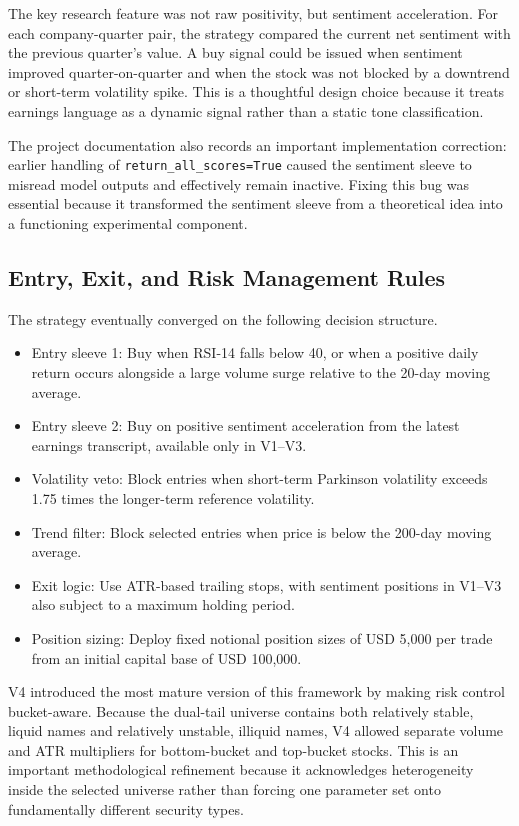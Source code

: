\documentclass[11pt,twoside,a4paper]{article}
\begin{document}
The key research feature was not raw positivity, but sentiment acceleration. For each company-quarter pair, the strategy compared the current net sentiment with the previous quarter's value. A buy signal could be issued when sentiment improved quarter-on-quarter and when the stock was not blocked by a downtrend or short-term volatility spike. This is a thoughtful design choice because it treats earnings language as a dynamic signal rather than a static tone classification.

The project documentation also records an important implementation correction: earlier handling of \verb|return_all_scores=True| caused the sentiment sleeve to misread model outputs and effectively remain inactive. Fixing this bug was essential because it transformed the sentiment sleeve from a theoretical idea into a functioning experimental component.

\subsection*{Entry, Exit, and Risk Management Rules}
The strategy eventually converged on the following decision structure.
\begin{itemize}
    \item Entry sleeve 1: Buy when RSI-14 falls below 40, or when a positive daily return occurs alongside a large volume surge relative to the 20-day moving average.
    \item Entry sleeve 2: Buy on positive sentiment acceleration from the latest earnings transcript, available only in V1--V3.
    \item Volatility veto: Block entries when short-term Parkinson volatility exceeds 1.75 times the longer-term reference volatility.
    \item Trend filter: Block selected entries when price is below the 200-day moving average.
    \item Exit logic: Use ATR-based trailing stops, with sentiment positions in V1--V3 also subject to a maximum holding period.
    \item Position sizing: Deploy fixed notional position sizes of USD 5,000 per trade from an initial capital base of USD 100,000.
\end{itemize}

V4 introduced the most mature version of this framework by making risk control bucket-aware. Because the dual-tail universe contains both relatively stable, liquid names and relatively unstable, illiquid names, V4 allowed separate volume and ATR multipliers for bottom-bucket and top-bucket stocks. This is an important methodological refinement because it acknowledges heterogeneity inside the selected universe rather than forcing one parameter set onto fundamentally different security types.
\end{document}
